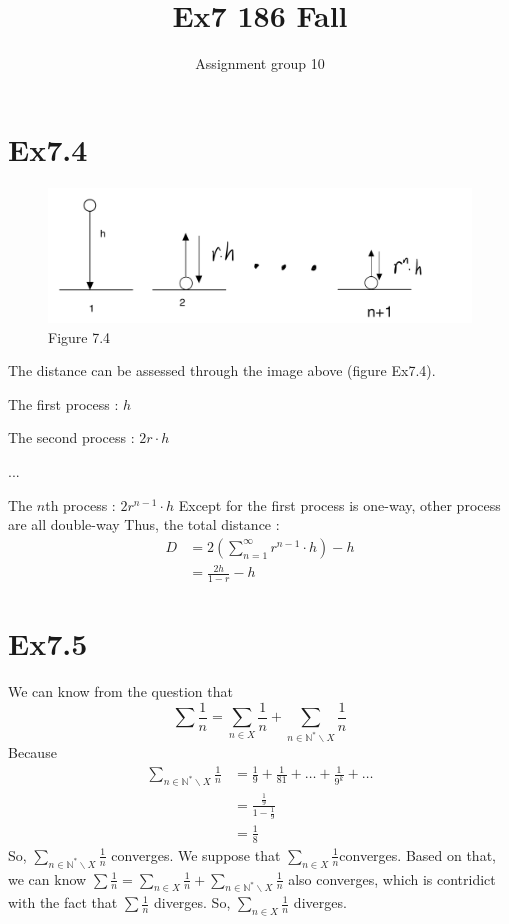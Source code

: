 \documentclass[11pt,twoside,a4paper]{article}
\begin{document}
\title{Ex7 186 Fall}
\author{Assignment group 10}
\date{}
\maketitle

\section{Ex7.4}
\begin{figure}[H]
    \centering
    \includegraphics[scale=0.5]{Ex7.4.png}
    \caption{Figure 7.4}
    \end{figure}
The distance can be assessed through the image above (figure Ex7.4).
\par 
The first process : $h$
\par 
The second process : $2r\cdot h$
\par 
$. . .$
\par 
The $n$th process : $2r^{n-1}\cdot h$
\newline
Except for the first process is one-way, other process are all double-way
Thus, the total distance :
\begin{equation}
    \begin{aligned}
        D&=2(\sum_{n = 1}^{\infty} r^{n-1} \cdot h)-h\\
        &=\frac{2h}{1-r}-h
    \end{aligned}
    \end{equation}

\section{Ex7.5}
We can know from the question that 
$$\displaystyle \sum \frac{1}{n}= \sum _{n\in X} \frac{1}{n} +\sum _{n \in \mathbb{N}^* \backslash X} \frac{1}{n}$$
Because 
\begin{equation}
    \begin{aligned}
        \displaystyle \sum _{n \in \mathbb{N}^* \backslash X} \frac{1}{n} &=
        \frac{1}{9}+\frac{1}{81}+\dots+\frac{1}{9^k}+\dots\\
        &=\frac{\frac{1}{9}}{1-\frac{1}{9}}\\
        &=\frac{1}{8}
    \end{aligned}
    \end{equation}
So, $\displaystyle \sum _{n \in \mathbb{N}^* \backslash X} \frac{1}{n}$ converges.
\newline
We suppose that $\displaystyle\sum _{n\in X} \frac{1}{n} $converges.
Based on that, we can know $\displaystyle \sum \frac{1}{n}= \sum _{n\in X} \frac{1}{n} +\sum _{n \in \mathbb{N}^* \backslash X} \frac{1}{n}$
also converges, which is contridict with the fact that  $\displaystyle \sum \frac{1}{n}$ diverges.
So, $\displaystyle\sum _{n\in X} \frac{1}{n} $ diverges.
\end{document}
